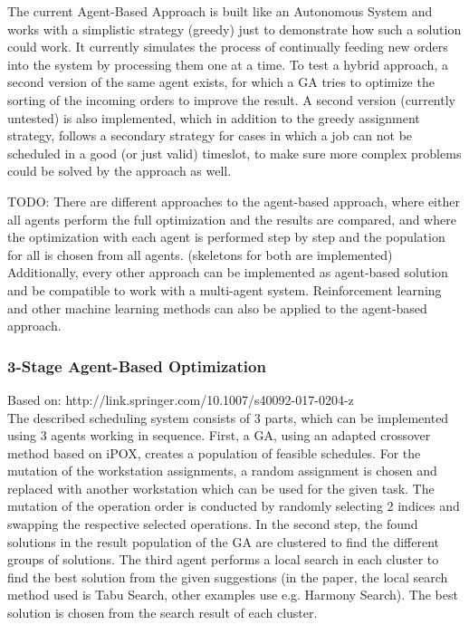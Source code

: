 \documentclass[a4paper,12pt,twoside]{scrreprt}
\begin{document}
\begin{flushleft}
The current Agent-Based Approach is built like an Autonomous System and works with a simplistic strategy (greedy) just to demonstrate how such a solution could work.
It currently simulates the process of continually feeding new orders into the system by processing them one at a time.
To test a hybrid approach, a second version of the same agent exists, for which a GA tries to optimize the sorting of the incoming orders to improve the result.
A second version (currently untested) is also implemented, which in addition to the greedy assignment strategy, follows a secondary strategy for cases in which a job can not be scheduled in a good (or just valid) timeslot, to make sure more complex problems could be solved by the approach as well.
\newline
\newline

TODO: 
There are different approaches to the agent-based approach, where either all agents perform the full optimization and the results are compared, and where the optimization with each agent is performed step by step and the population for all is chosen from all agents. (skeletons for both are implemented)
\newline
Additionally, every other approach can be implemented as agent-based solution and be compatible to work with a multi-agent system.
Reinforcement learning and other machine learning methods can also be applied to the agent-based approach.


\subsubsection{3-Stage Agent-Based Optimization}
Based on: http://link.springer.com/10.1007/s40092-017-0204-z \\
The described scheduling system consists of 3 parts, which can be implemented using 3 agents working in sequence. First, a GA, using an adapted crossover method based on iPOX, creates a population of feasible schedules. For the mutation of the workstation assignments, a random assignment is chosen and replaced with another workstation which can be used for the given task. The mutation of the operation order is conducted by randomly selecting 2 indices and swapping the respective selected operations.
In the second step, the found solutions in the result population of the GA are clustered to find the different groups of solutions.
The third agent performs a local search in each cluster to find the best solution from the given suggestions (in the paper, the local search method used is Tabu Search, other examples use e.g. Harmony Search).
The best solution is chosen from the search result of each cluster.


\end{flushleft}
\end{document}
